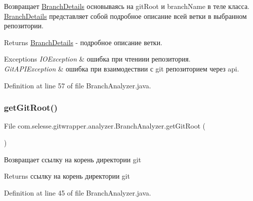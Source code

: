 Возвращает \hyperlink{classcom_1_1selesse_1_1gitwrapper_1_1analyzer_1_1_branch_details}{Branch\+Details} основываясь на git\+Root и branch\+Name в теле класса. \hyperlink{classcom_1_1selesse_1_1gitwrapper_1_1analyzer_1_1_branch_details}{Branch\+Details} представляет собой подробное описание всей ветки в выбранном репозитории.

\begin{DoxyReturn}{Returns}
\hyperlink{classcom_1_1selesse_1_1gitwrapper_1_1analyzer_1_1_branch_details}{Branch\+Details} -\/ подробное описание ветки. 
\end{DoxyReturn}

\begin{DoxyExceptions}{Exceptions}
{\em I\+O\+Exception} & ошибка при чтениии репозитория. \\
\hline
{\em Git\+A\+P\+I\+Exception} & ошибка при взаимодествии с git репозиторием через api. \\
\hline
\end{DoxyExceptions}


Definition at line 57 of file Branch\+Analyzer.\+java.

\mbox{\label{classcom_1_1selesse_1_1gitwrapper_1_1analyzer_1_1_branch_analyzer_a6226073e5c8a4645aadafbc815bf7edc}} 
\subsubsection{\texorpdfstring{get\+Git\+Root()}{getGitRoot()}}
{\footnotesize\ttfamily File com.\+selesse.\+gitwrapper.\+analyzer.\+Branch\+Analyzer.\+get\+Git\+Root (\begin{DoxyParamCaption}{ }\end{DoxyParamCaption})}

Возвращает ссылку на корень директории git

\begin{DoxyReturn}{Returns}
ссылку на корень директории git 
\end{DoxyReturn}


Definition at line 45 of file Branch\+Analyzer.\+java.



